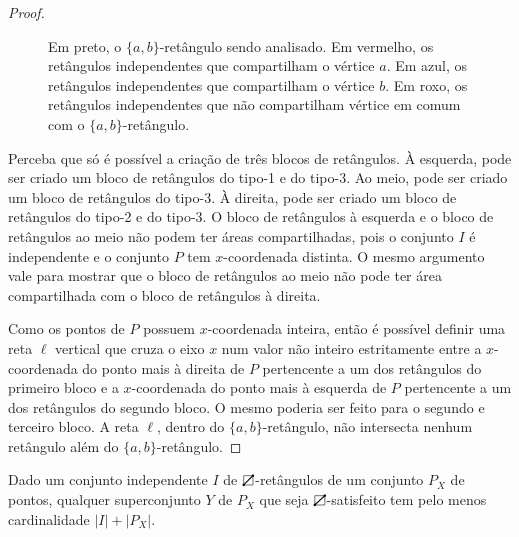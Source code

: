 \begin{proof}
\begin{figure}
    \caption{Em preto, o $\{a,b\}$-retângulo sendo analisado. Em vermelho, os retângulos independentes que compartilham o vértice $a$. Em azul, os retângulos independentes que compartilham o vértice $b$. Em roxo, os retângulos independentes que não compartilham vértice em comum com o $\{a,b\}$-retângulo.}
\label{fig:retangulo_wider}
\end{figure}

    Perceba que só é possível a criação de três blocos de retângulos. À esquerda, pode ser criado um bloco de retângulos do tipo-1 e do tipo-3. Ao meio, pode ser criado um bloco de retângulos do tipo-3. À direita, pode ser criado um bloco de retângulos do tipo-2 e do tipo-3. O bloco de retângulos à esquerda e o bloco de retângulos ao meio não podem ter áreas compartilhadas, pois o conjunto $I$ é independente e o conjunto $P$ tem $x$-coordenada distinta. O mesmo argumento vale para mostrar que o bloco de retângulos ao meio não pode ter área compartilhada com o bloco de retângulos à direita.

    Como os pontos de $P$ possuem $x$-coordenada inteira, então é possível definir uma reta $\ell$ vertical que cruza o eixo $x$ num valor não inteiro estritamente entre a $x$-coordenada do ponto mais à direita de $P$ pertencente a um dos retângulos do primeiro bloco e a $x$-coordenada do ponto mais à esquerda de $P$ pertencente a um dos retângulos do segundo bloco. O mesmo poderia ser feito para o segundo e terceiro bloco. A reta $\ell$, dentro do $\{a,b\}$-retângulo, não intersecta nenhum retângulo além do $\{a,b\}$-retângulo.
\end{proof}


\begin{lemma} \label{lema_6.4}
    Dado um conjunto independente $I$ de $\rectpos$-retângulos de um conjunto $P_X$ de pontos, qualquer superconjunto $Y$ de $P_X$ que seja $\rectpos$-satisfeito tem pelo menos cardinalidade $|I| + |P_X|$. 
\end{lemma}

